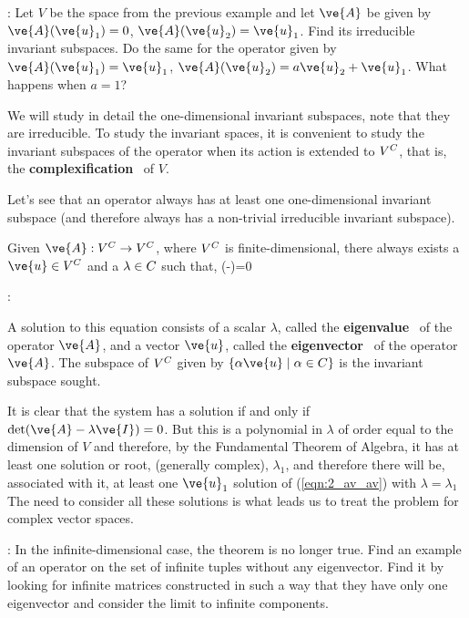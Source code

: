 \ejer: Let $V$ be the space from the previous example and let $\ve{A}$ be given by $\ve{A}(\ve{u}_1) = 0$,  $\ve{A}(\ve{u}_2) = \ve{u}_1$. Find its irreducible invariant subspaces. Do the same for the operator given by 
$\ve{A}(\ve{u}_1) = \ve{u}_1$,  $\ve{A}(\ve{u}_2) = a \ve{u}_2 + \ve{u}_1$. What happens when $a=1$?

We will study in detail the one-dimensional invariant subspaces, note that they are irreducible. 
To study the invariant spaces, it is convenient to study the invariant subspaces of the operator when its action is extended to $V^{C}$, that is, the 
\textbf{complexification}~ of $V$.

Let's see that an operator always has at least one one-dimensional invariant subspace (and therefore always has a non-trivial irreducible invariant subspace).

\begin{lem}
Given $\ve{A}: V^{\Complex} \to V^{\Complex}$, where $V^{C}$ is finite-dimensional, there always exists a $\ve{u} \in V^{\Complex}$
and a $\lambda \in C$ such that,
\beq
(-\lambda {})=0   
\label{eqn:2_av_av}
\eeq
\end{lem}

\pru:

A solution to this equation consists of a scalar $\lambda$, called the {\bf eigenvalue}~ of
the operator $\ve{A}$, and a vector $\ve{u}$, called the {\bf eigenvector}~
of the operator $\ve{A}$. The subspace of $V^{C}$ given by 
$\{\alpha \ve{u}\;|\; \alpha \in \Complex\}$ is the invariant subspace sought.

It is clear that the system has a solution if and only if $ \det(\ve{A}-\lambda\ve{I})=0$. But this is a polynomial in
$\lambda$ of order equal to the dimension of $V$ and therefore, by the Fundamental Theorem of Algebra, it has
at least one solution or root, (generally complex), $\lambda_1$, 
and therefore there will be, associated with it, 
at least one $\ve{u}_1$ solution of (\ref{eqn:2_av_av}) with $\lambda = \lambda_1$
\epru
\espa
The need to consider all these solutions is what leads us to treat the problem for complex vector spaces. 

\ejer: In the infinite-dimensional case, the theorem is no longer true. Find an example of an operator on the set of infinite tuples without any eigenvector. Find it by looking for infinite matrices constructed in such a way that they have only one eigenvector and consider the limit to infinite components.

